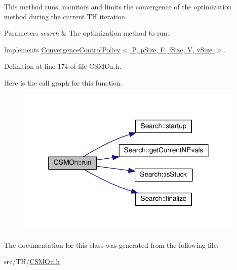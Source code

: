 This method runs, monitors and limits the convergence of the optimization method during the current \hyperlink{classTH}{TH} iteration. 


\begin{DoxyParams}{Parameters}
{\em search} & The optimization method to run. \\
\hline
\end{DoxyParams}


Implements \hyperlink{classConvergenceControlPolicy_ad72beb5807e87c3fa0602bd0bf4679ac}{Convergence\+Control\+Policy$<$ P, p\+Size, F, f\+Size, V, v\+Size $>$}.



Definition at line 174 of file C\+S\+M\+On.\+h.



Here is the call graph for this function\+:
\nopagebreak
\begin{figure}[H]
\begin{center}
\leavevmode
\includegraphics[width=336pt]{classCSMOn_a430398bc3e096631f8cd180ee1877616_cgraph}
\end{center}
\end{figure}




The documentation for this class was generated from the following file\+:\begin{DoxyCompactItemize}
\item 
src/\+T\+H/\hyperlink{CSMOn_8h}{C\+S\+M\+On.\+h}\end{DoxyCompactItemize}
